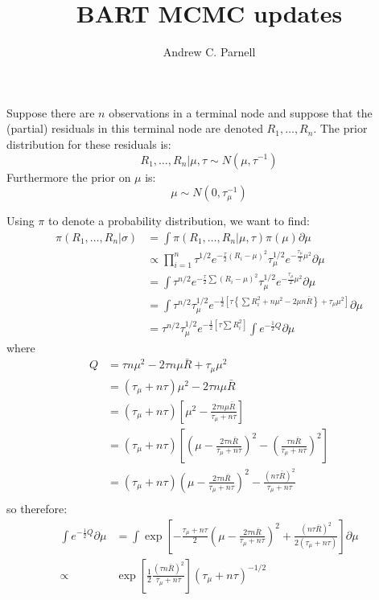 \documentclass{article}
\begin{document}
\title{BART MCMC updates}
\author{Andrew C. Parnell}
\maketitle

Suppose there are $n$ observations in a terminal node and suppose that the (partial) residuals in this terminal node are denoted $R_1, \ldots, R_n$. The prior distribution for these residuals is:
$$ R_1, \ldots, R_n | \mu, \tau \sim N(\mu, \tau^{-1})$$
Furthermore the prior on $\mu$ is:
$$\mu \sim N(0, \tau_{\mu}^{-1})$$

Using $\pi$ to denote a probability distribution, we want to find:
\begin{align*}
\pi(R_1, \ldots, R_n| \sigma) &= \int \pi(R_1, \ldots, R_n| \mu, \tau) \pi(\mu) \partial \mu \\
&\propto \prod_{i=1}^n \tau^{1/2} e^{-\frac{\tau}{2} (R_i - \mu)^2} \tau_{\mu}^{1/2} e^{-\frac{\tau_\mu}{2} \mu^2 } \partial \mu \\
&= \int \tau^{n/2} e^{-\frac{\tau}{2} \sum (R_i - \mu)^2} \tau_{\mu}^{1/2} e^{-\frac{\tau_\mu}{2} \mu^2 } \partial \mu \\
&= \int \tau^{n/2} \tau_{\mu}^{1/2} e^{-\frac{1}{2} \left[ \tau \left\{ \sum R_i^2 + n \mu^2 - 2 \mu n \bar{R} \right\} + \tau_\mu \mu^2 \right]} \partial \mu \\
&= \tau^{n/2} \tau_{\mu}^{1/2} e^{-\frac{1}{2} \left[ \tau \sum R_i^2 \right]} \int e^{-\frac{1}{2} Q} \partial \mu 
\end{align*}
where 
\begin{align*}
Q &= \tau n \mu^2 - 2\tau n \mu \bar{R} + \tau_\mu \mu^2 \\
&= (\tau_\mu + n \tau) \mu^2 - 2\tau n \mu \bar{R} \\
&= (\tau_\mu + n \tau) \left[ \mu^2 - \frac{2 \tau n \mu \bar{R}}{ \tau_\mu + n \tau } \right]\\
&= (\tau_\mu + n \tau) \left[ \left( \mu - \frac{2 \tau n \bar{R}}{ \tau_\mu + n \tau } \right)^2 - \left( \frac{ \tau n \bar{R} }{ \tau_\mu + n \tau} \right)^2 \right]\\
&= (\tau_\mu + n \tau) \left( \mu - \frac{2 \tau n \bar{R}}{ \tau_\mu + n \tau } \right)^2 - \frac{(n \tau \bar{R})^2}{ \tau_\mu + n \tau}\\
\end{align*}
so therefore:
\begin{align*}
 \int e^{-\frac{1}{2} Q} \partial \mu &= \int \exp \left[  - \frac{\tau_\mu + n \tau}{2} \left( \mu - \frac{2 \tau n \bar{R}}{ \tau_\mu + n \tau } \right)^2 + \frac{(n \tau \bar{R})^2}{2( \tau_\mu + n \tau)} \right] \partial \mu \\
\propto &  \exp \left[ \frac{1}{2} \frac{ (\tau n \bar{R})^2 }{ \tau_\mu + n \tau } \right] (\tau_\mu + n \tau)^{-1/2}
\end{align*}
\end{document}
